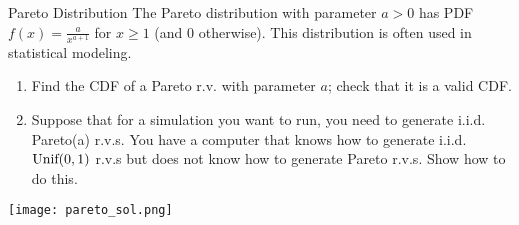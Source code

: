 \documentclass[11.5pt]{article}
\begin{document}





\begin{exercise}{Pareto Distribution} 
The Pareto distribution with parameter $a > 0$ has PDF $f(x) =\frac {a}{x^{a+1}}$ for $x \geq 1$ (and 0 otherwise). This distribution is often used in statistical modeling. 
\begin{enumerate}
\item Find the CDF of a Pareto r.v. with parameter $a$; check that it is a valid CDF. 

\item Suppose that for a simulation you want to run, you need to generate i.i.d. Pareto(a) r.v.s. You have a computer that knows how to generate i.i.d. $\textrm{Unif}(0, 1)$ r.v.s but does not know how to generate Pareto r.v.s. Show how to do this.
\end{enumerate}

\end{exercise}

\begin{solution}{3}
\texttt{[image: pareto\_sol.png]}

\end{solution}
\end{document}
